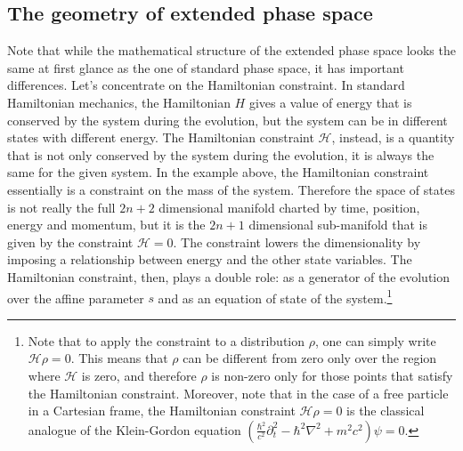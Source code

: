 \subsection{The geometry of extended phase space}

Note that while the mathematical structure of the extended phase space looks the same at first glance as the one of standard phase space, it has important differences. Let's concentrate on the Hamiltonian constraint. In standard Hamiltonian mechanics, the Hamiltonian $H$ gives a value of energy that is conserved by the system during the evolution, but the system can be in different states with different energy. The Hamiltonian constraint $\mathcal{H}$, instead, is a quantity that is not only conserved by the system during the evolution, it is always the same for the given system. In the example above, the Hamiltonian constraint essentially is a constraint on the mass of the system. Therefore the space of states is not really the full $2n+2$ dimensional manifold charted by time, position, energy and momentum, but it is the $2n+1$ dimensional sub-manifold that is given by the constraint $\mathcal{H}=0$. The constraint lowers the dimensionality by imposing a relationship between energy and the other state variables. The Hamiltonian constraint, then, plays a double role: as a generator of the evolution over the affine parameter $s$ and as an equation of state of the system.\footnote{Note that to apply the constraint to a distribution $\rho$, one can simply write $\mathcal{H} \rho = 0$. This means that $\rho$ can be different from zero only over the region where $\mathcal{H}$ is zero, and therefore $\rho$ is non-zero only for those points that satisfy the Hamiltonian constraint. Moreover, note that in the case of a free particle in a Cartesian frame, the Hamiltonian constraint $\mathcal{H} \rho = 0$ is the classical analogue of the Klein-Gordon equation $\left( \frac{\hbar^2}{c^2} \partial_t^2 - \hbar^2 \nabla^2 + m^2c^2 \right) \psi = 0$.}

